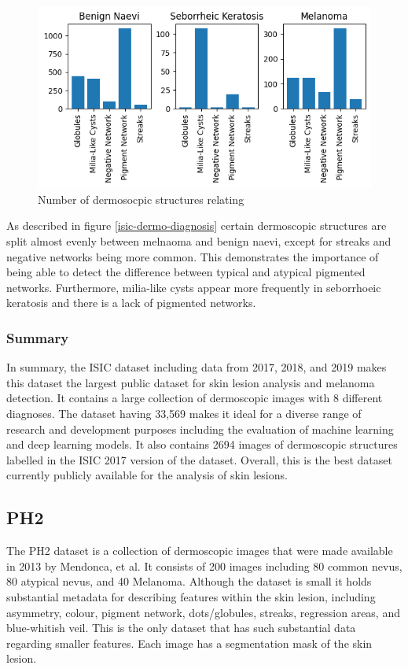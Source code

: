 \begin{figure}
	\centering
	\includegraphics[scale=0.8]{images/ISIC/isic-dermo-diagnosis.png}
	\caption{Number of dermosocpic structures relating} 
\end{figure} \label{isic-dermo-diagnosis}

As described in figure \ref{isic-dermo-diagnosis} certain dermoscopic structures are split almost evenly between melnaoma and benign naevi, except for streaks and negative networks being more common. This demonstrates the importance of being able to detect the difference between typical and atypical pigmented networks. Furthermore, milia-like cysts appear more frequently in seborrhoeic keratosis and there is a lack of pigmented networks.

\subsubsection{Summary}
In summary, the ISIC dataset including data from 2017, 2018, and 2019 makes this dataset the largest public dataset for skin lesion analysis and melanoma detection. It contains a large collection of dermoscopic images with 8 different diagnoses. The dataset having 33,569 makes it ideal for a diverse range of research and development purposes including the evaluation of machine learning and deep learning models. It also contains 2694 images of dermoscopic structures labelled in the ISIC 2017 version of the dataset. Overall, this is the best dataset currently publicly available for the analysis of skin lesions.

\subsection{PH2}
The PH2 dataset is a collection of dermoscopic images that were made available in 2013 by Mendonca, et al\cite{}. It consists of 200 images including 80 common nevus, 80 atypical nevus, and 40 Melanoma. Although the dataset is small it holds substantial metadata for describing features within the skin lesion, including asymmetry, colour, pigment network, dots/globules, streaks, regression areas, and blue-whitish veil. This is the only dataset that has such substantial data regarding smaller features. Each image has a segmentation mask of the skin lesion.

